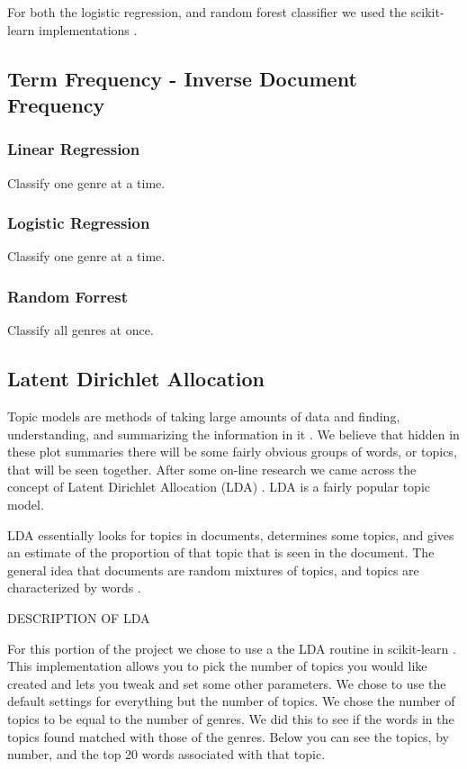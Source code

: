 \documentclass[11pt]{article}
\begin{document}
For both the logistic regression, and random forest classifier we used the scikit-learn implementations \cite{scikit-learn}.

\subsection{Term Frequency - Inverse Document Frequency}
\label{sec:tfidf}

\subsubsection{Linear Regression}

Classify one genre at a time.

\subsubsection{Logistic Regression}

Classify one genre at a time.

\subsubsection{Random Forrest}

Classify all genres at once.


\subsection{Latent Dirichlet Allocation}
\label{sec:lda}

Topic models are methods of taking large amounts of data and finding, understanding, and summarizing the information in it \cite{wiki:topic_model, kdnuggets:topic_model}. We believe that hidden in these plot summaries there will be some fairly obvious groups of words, or topics, that will be seen together. After some on-line research we came across the concept of Latent Dirichlet Allocation (LDA) \cite{blei2003}. LDA is a fairly popular topic model. 

LDA essentially looks for topics in documents, determines some topics, and gives an estimate of the proportion of that topic that is seen in the document. The general idea that documents are random mixtures of topics, and topics are characterized by words \cite{blei2003}. 

DESCRIPTION OF LDA

For this portion of the project we chose to use a the LDA routine in scikit-learn \cite{scikit-learn}. This implementation allows you to pick the number of topics you would like created and lets you tweak and set some other parameters. We chose to use the default settings for everything but the number of topics. We chose the number of topics to be equal to the number of genres. We did this to see if the words in the topics found matched with those of the genres. Below you can see the topics, by number, and the top 20 words associated with that topic.
\end{document}
